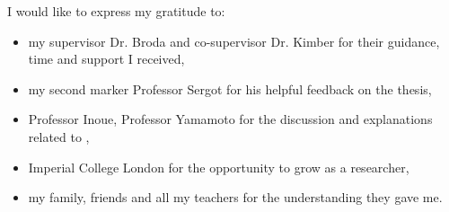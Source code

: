 
\cleardoublepage


\begin{acknowledgements}

I would like to express my gratitude to:

\begin{itemize}
 \item my supervisor Dr. Broda and co-supervisor Dr. Kimber for their guidance, time and support I received,
 \vspace*{3mm}
 \item my second marker Professor Sergot for his helpful feedback on the thesis,
 \vspace*{3mm}
 \item Professor Inoue, Professor Yamamoto for the discussion and explanations related to \cite{yamamoto2012inverse},
 \vspace*{3mm}
  \item Imperial College London for the opportunity to grow as a researcher,
 \vspace*{3mm} 
 \item my family, friends and all my teachers for the understanding they gave me.
\end{itemize}

\end{acknowledgements}
